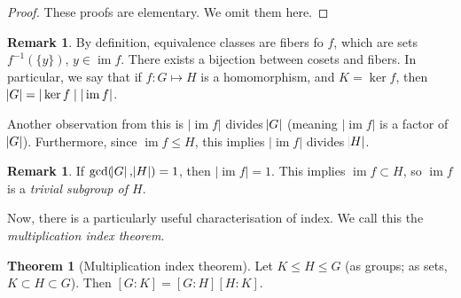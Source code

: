\documentclass[11pt]{amsart} %
\theoremstyle{definition}
\newtheorem{theorem}[definition]{Theorem}
\theoremstyle{definition}
\newtheorem{remark}[definition]{Remark}
\DeclareMathOperator{\im}{im}
\numberwithin{equation}{section}
\begin{document}
\begin{proof}
	These proofs are elementary. We omit them here.
\end{proof}

\begin{remark}
	By definition, equivalence classes are fibers fo $f$, which are sets $f^{-1} ( \{y\})$, $y \in \im f$. There exists a bijection between cosets and fibers. In particular, we say that if $f : G \mapsto H$ is a homomorphism, and $K= \ker f$, then $\abs{G} = |\ker f\mid |\im f|$.
	
	Another observation from this is $|\im f|$ divides $\abs{G}$ (meaning $|\im f|$ is a factor of $\abs{G}$). Furthermore, since $\im f \leq H$, this implies $|\im f|$ divides $\abs{H}$.
\end{remark}

\begin{remark}
	If $\gcd (\abs{G},\abs{H}) = 1$, then $|\im f\mid = 1$. This implies $\im f \subset H$, so $\im f $ is a \textit{trivial subgroup of $H$}.
\end{remark}

Now, there is a particularly useful characterisation of index. We call this the \textit{multiplication index theorem}.

\begin{theorem}[Multiplication index theorem]
	\label{thmmultiplicationindexthm}
	Let $K \leq H \leq G$ (as groups; as sets, $K \subset H \subset G$). Then $[G:K] = [G:H] [H:K]$.
\end{theorem}
\end{document}
